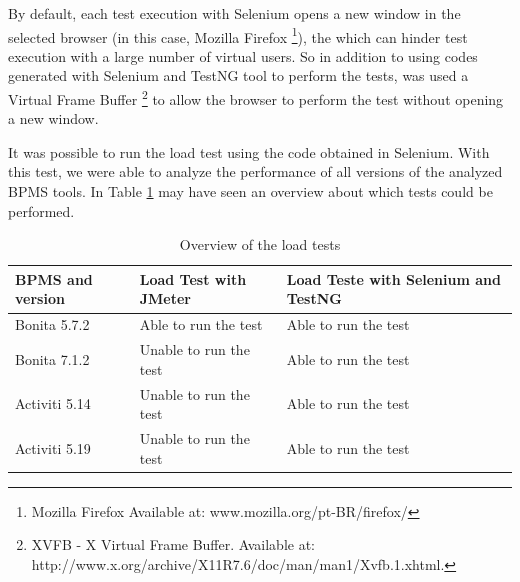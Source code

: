 \documentclass[runningheads,a4paper]{llncs}
\begin{document}
By default, each test execution with Selenium opens a new window in the selected browser (in this case, Mozilla Firefox \footnote{Mozilla Firefox Available at: www.mozilla.org/pt-BR/firefox/}), the which can hinder test execution with a large number of virtual users. So in addition to using codes generated with Selenium and TestNG tool to perform the tests, was used a Virtual Frame Buffer \footnote{XVFB - X Virtual Frame Buffer. Available at: http://www.x.org/archive/X11R7.6/doc/man/man1/Xvfb.1.xhtml.} to allow the browser to perform the test without opening a new window.

It was possible to run the load test using the code obtained in Selenium. With this test, we were able to analyze the performance of all versions of the analyzed BPMS tools. In Table \ref{tab:foiPossivelCarga} may have seen an overview about which tests could be performed. 

\begin{table}
\centering
\begin{tabular}{p{3cm}|p{3cm}|p{3cm}}
\hline
BPMS and version & Load Test with JMeter & Load Teste with Selenium and TestNG \\\hline
Bonita 5.7.2 & Able to run the test & Able to run the test \\\hline
Bonita 7.1.2 & Unable to run the test & Able to run the test \\\hline
Activiti 5.14 & Unable to run the test & Able to run the test \\\hline
Activiti 5.19 & Unable to run the test & Able to run the test \\\hline
\end{tabular}
\caption{Overview of the load tests}
\label{tab:foiPossivelCarga}
\end{table}
\end{document}
